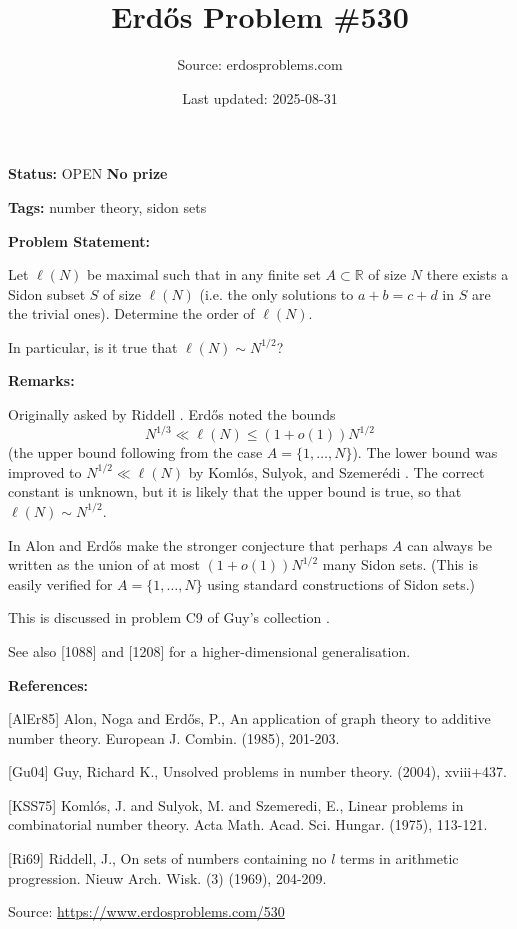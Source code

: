 \documentclass{article}
\title{Erd\H{o}s Problem \#530}
\date{Last updated: 2025-08-31}
\author{Source: erdosproblems.com}
\begin{document}
\maketitle

\noindent\textbf{Status:} OPEN \quad \textbf{No prize}

\noindent\textbf{Tags:} number theory, sidon sets

\medskip
\noindent\textbf{Problem Statement:}

Let $\ell(N)$ be maximal such that in any finite set $A\subset \mathbb{R}$ of size $N$ there exists a Sidon subset $S$ of size $\ell(N)$ (i.e. the only solutions to $a+b=c+d$ in $S$ are the trivial ones). Determine the order of $\ell(N)$.

In particular, is it true that $\ell(N)\sim N^{1/2}$?

\bigskip
\noindent\textbf{Remarks:}

Originally asked by Riddell \cite{Ri69}. Erd\H{o}s noted the bounds\[N^{1/3} \ll \ell(N) \leq (1+o(1))N^{1/2}\](the upper bound following from the case $A=\{1,\ldots,N\}$). The lower bound was improved to $N^{1/2}\ll \ell(N)$ by Koml\'{o}s, Sulyok, and Szemer\'{e}di \cite{KSS75}. The correct constant is unknown, but it is likely that the upper bound is true, so that $\ell(N)\sim N^{1/2}$.

In \cite{AlEr85} Alon and Erd\H{o}s make the stronger conjecture that perhaps $A$ can always be written as the union of at most $(1+o(1))N^{1/2}$ many Sidon sets. (This is easily verified for $A=\{1,\ldots,N\}$ using standard constructions of Sidon sets.)

This is discussed in problem C9 of Guy's collection \cite{Gu04}.

See also [1088] and [1208] for a higher-dimensional generalisation.

\bigskip
\noindent\textbf{References:}

[AlEr85] Alon, Noga and Erd\H{o}s, P., An application of graph theory to additive number theory. European J. Combin. (1985), 201-203.
 
 [Gu04] Guy, Richard K., Unsolved problems in number theory. (2004), xviii+437.
 
 [KSS75] Koml\'{o}s, J. and Sulyok, M. and Szemeredi, E., Linear problems in combinatorial number theory. Acta Math. Acad. Sci. Hungar. (1975), 113-121.
 
 [Ri69] Riddell, J., On sets of numbers containing no $l$ terms in arithmetic progression. Nieuw Arch. Wisk. (3) (1969), 204-209.

\bigskip
\noindent\small{Source: \url{https://www.erdosproblems.com/530}}
\end{document}
